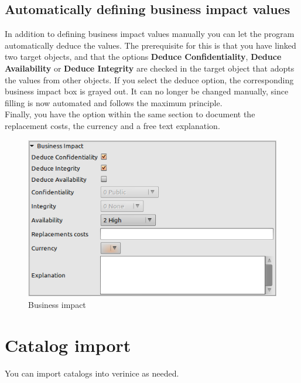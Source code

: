 \documentclass[a4paper,10pt]{book}
\begin{document}
\subsection{Automatically defining business impact values} \label{Automatically defining business impact values}
In addition to defining business impact values manually you can let the program automatically deduce the values.
The prerequisite for this is that you have linked two target objects, and that the options
\textbf{Deduce Confidentiality}, \textbf{Deduce Availability} or \textbf{Deduce Integrity}
are checked in the target object that adopts the values from other objects. If you select the deduce
option, the corresponding business impact box is grayed out. It can no longer be changed manually, since
filling is now automated and follows the maximum principle.
\newline\\
Finally, you have the option within the same section to document the replacement costs, the currency and a
free text explanation.
\newline
\begin{figure}[htb!]
  \centering
  \includegraphics[scale=.5]{Screenshot/Business_Impact-en.png}
  \caption{\label{Business impact} Business impact}
\end{figure}
\newline

\section{Catalog import}
You can import catalogs into verinice as needed.
\end{document}
